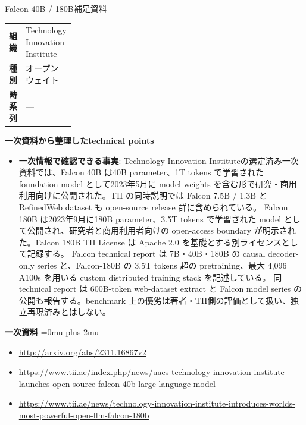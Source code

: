 \begin{technicalnote}{Falcon 40B / 180B}{補足資料}
\begingroup
\begin{tabularx}{\linewidth}{@{}>{\bfseries}p{0.22\linewidth}X@{}}
組織 & Technology Innovation Institute \\
種別 & オープンウェイト \\
時系列 & — \\
\end{tabularx}
\smallskip
{\bfseries 一次資料から整理したtechnical points}
\begin{itemize}[leftmargin=1.5em,itemsep=0.35em]
\item \textbf{一次情報で確認できる事実}: Technology Innovation Instituteの選定済み一次資料では、Falcon 40B は40B parameter、1T tokens で学習された foundation model として2023年5月に model weights を含む形で研究・商用利用向けに公開された。TII の同時説明では Falcon 7.5B / 1.3B と RefinedWeb dataset も open-source release 群に含められている。 Falcon 180B は2023年9月に180B parameter、3.5T tokens で学習された model として公開され、研究者と商用利用者向けの open-access boundary が明示された。Falcon 180B TII License は Apache 2.0 を基礎とする別ライセンスとして記録する。 Falcon technical report は 7B・40B・180B の causal decoder-only series と、Falcon-180B の 3.5T tokens 超の pretraining、最大 4,096 A100s を用いる custom distributed training stack を記述している。 同 technical report は 600B-token web-dataset extract と Falcon model series の公開も報告する。benchmark 上の優劣は著者・TII側の評価として扱い、独立再現済みとはしない。
\end{itemize}
\begin{minipage}{\linewidth}
\begin{samepage}
{\bfseries 一次資料}
\begingroup\sloppy
\Urlmuskip=0mu plus 2mu\relax
\begin{itemize}[leftmargin=1.5em,itemsep=0.25em]
\item {\scriptsize\url{http://arxiv.org/abs/2311.16867v2}}
\item {\scriptsize\url{https://www.tii.ae/index.php/news/uaes-technology-innovation-institute-launches-open-source-falcon-40b-large-language-model}}
\item {\scriptsize\url{https://www.tii.ae/news/technology-innovation-institute-introduces-worlds-most-powerful-open-llm-falcon-180b}}
\end{itemize}
\endgroup
\end{samepage}
\end{minipage}
\endgroup
\end{technicalnote}
\medskip


